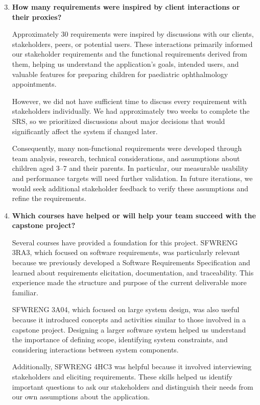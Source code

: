 \documentclass[10pt]{article}
\begin{document}
\begin{enumerate}
    \setcounter{enumi}{2}

    \item \textbf{How many requirements were inspired by client interactions
    or their proxies?}

    Approximately 30 requirements were inspired by discussions with our
    clients, stakeholders, peers, or potential users. These interactions
    primarily informed our stakeholder requirements and the functional
    requirements derived from them, helping us understand the application's
    goals, intended users, and valuable features for preparing children
    for paediatric ophthalmology appointments.

    However, we did not have sufficient time to discuss every requirement
    with stakeholders individually. We had approximately two weeks to
    complete the SRS, so we prioritized discussions about major decisions
    that would significantly affect the system if changed later.

    Consequently, many non-functional requirements were developed through
    team analysis, research, technical considerations, and assumptions
    about children aged 3--7 and their parents. In particular, our measurable
    usability and performance targets will need further validation.
    In future iterations, we would seek additional stakeholder feedback
    to verify these assumptions and refine the requirements.

    \item \textbf{Which courses have helped or will help your team
    succeed with the capstone project?}

    Several courses have provided a foundation for this project.
    SFWRENG 3RA3, which focused on software requirements, was particularly
    relevant because we previously developed a Software Requirements
    Specification and learned about requirements elicitation, documentation,
    and traceability. This experience made the structure and purpose of
    the current deliverable more familiar.

    SFWRENG 3A04, which focused on large system design, was also useful
    because it introduced concepts and activities similar to those involved
    in a capstone project. Designing a larger software system helped us
    understand the importance of defining scope, identifying system
    constraints, and considering interactions between system components.

    Additionally, SFWRENG 4HC3 was helpful because it involved interviewing
    stakeholders and eliciting requirements. These skills helped us identify
    important questions to ask our stakeholders and distinguish their needs
    from our own assumptions about the application.


\end{enumerate}
\end{document}
